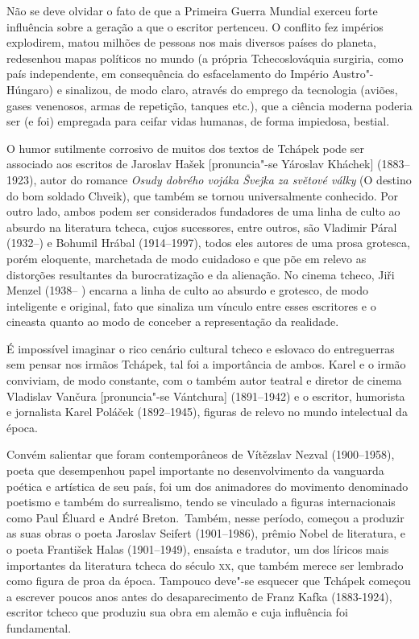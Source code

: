 Não se deve olvidar o fato de que a Primeira Guerra Mundial exerceu forte
influência sobre a geração a que o escritor pertenceu. O conflito fez impérios
explodirem, matou milhões de pessoas nos mais diversos países do planeta,
redesenhou mapas políticos no mundo (a própria Tchecoslováquia surgiria, como
país independente, em consequência do esfacelamento do Império Austro"-Húngaro)
e sinalizou, de modo claro, através do emprego da tecnologia (aviões, gases
venenosos, armas de repetição, tanques etc.), que a ciência
moderna poderia ser (e foi) empregada para ceifar vidas humanas, de forma
impiedosa, bestial. 

O humor sutilmente corrosivo de muitos dos textos de Tchápek pode ser
associado aos escritos de Jaroslav Hašek [pronuncia"-se  Yároslav Kháchek]
(1883--1923), autor do romance \textit{Osudy dobrého
vojáka Švejka za světové války} (O destino do bom soldado Chveik), 
que também se tornou universalmente conhecido.
Por outro lado, ambos podem ser considerados fundadores de uma linha de culto
ao absurdo na literatura tcheca, cujos sucessores, entre outros, são Vladimir
Páral (1932--) e Bohumil Hrábal (1914--1997), todos eles autores de uma prosa
grotesca, porém eloquente, marchetada de modo cuidadoso e que põe em relevo as
distorções resultantes da burocratização e da alienação. No cinema tcheco, Jiři
Menzel (1938-- ) encarna a linha de culto ao absurdo e grotesco, de modo
inteligente e original, fato que sinaliza um vínculo entre esses escritores e o
cineasta quanto ao modo de conceber a representação da realidade. 

É impossível imaginar o rico cenário cultural tcheco e eslovaco do
entreguerras sem pensar nos irmãos Tchápek, tal foi a importância de ambos. Karel
e o irmão conviviam, de modo constante, com o também autor teatral e diretor de
cinema Vladislav Vančura [pronuncia"-se Vántchura] (1891--1942) e o escritor,
humorista e jornalista Karel Poláček (1892--1945), figuras de relevo no mundo
intelectual da época.

Convém salientar que foram contemporâneos de Vítězslav Nezval (1900--1958),
poeta que desempenhou papel importante no desenvolvimento da vanguarda poética		\EP[-1]
e artística de seu país, foi um dos animadores do movimento denominado poetismo
 e também do surrealismo, tendo se vinculado a figuras internacionais como Paul
Éluard e André Breton.~Também, nesse período, começou a produzir as suas obras
o poeta Jaroslav Seifert (1901--1986), prêmio Nobel de literatura, e o poeta
František Halas (1901--1949), ensaísta e tradutor, um dos líricos mais
importantes da literatura tcheca do século \textsc{xx}, que também merece ser lembrado
como figura de proa da época. Tampouco deve"-se esquecer que Tchápek começou a
escrever poucos anos antes do desaparecimento de Franz Kafka (1883-1924),
escritor tcheco que produziu sua obra em alemão e cuja influência foi
fundamental.

